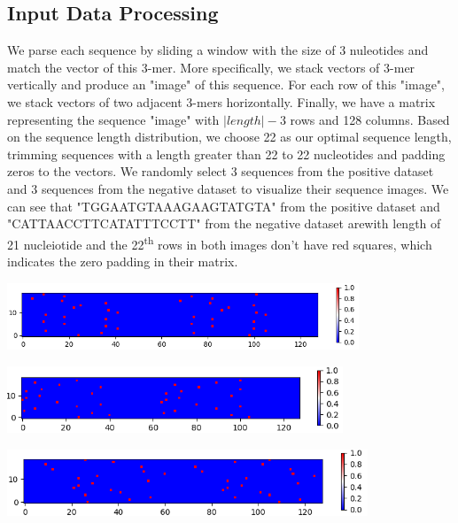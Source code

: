 \documentclass[letterpaper, 11pt]{article}
\newenvironment{Figure}
  {\par\medskip\noindent\minipage{\linewidth}}
  {\endminipage\par\medskip}
\begin{document}
\begin{multicols*}{2}
{\subsection{Input Data Processing}
We parse each sequence by sliding a window with the size of 3 nuleotides and match the vector of this 3-mer. More specifically, we stack vectors of 3-mer vertically and produce an "image" of this sequence. For each row of this "image", we stack vectors of two adjacent 3-mers horizontally. Finally, we have a matrix representing the sequence "image" with $|length|-3$ rows and 128 columns. Based on the sequence length distribution, we choose 22 as our optimal sequence length, trimming sequences with a length greater than 22 to 22 nucleotides and padding zeros to the vectors. We randomly select 3 sequences from the positive dataset and 3 sequences from the negative dataset to visualize their sequence images. We can see that "TGGAATGTAAAGAAGTATGTA" from the positive dataset and "CATTAACCTTCATATTTCCTT" from the negative dataset arewith length of 21 nucleiotide and the 22\textsuperscript{th} rows in both images don't have red squares, which indicates the zero padding in their matrix.
\begin{Figure}
\includegraphics[height=2cm, width=\textwidth]{pos1.png}
\end{Figure} 
\begin{Figure}
\includegraphics[height=2cm, width=\textwidth]{pos2.png}
\end{Figure} 
\begin{Figure}
\includegraphics[height=2cm, width=\textwidth]{pos3.png}

\end{Figure}}
\end{multicols*}
\end{document}
